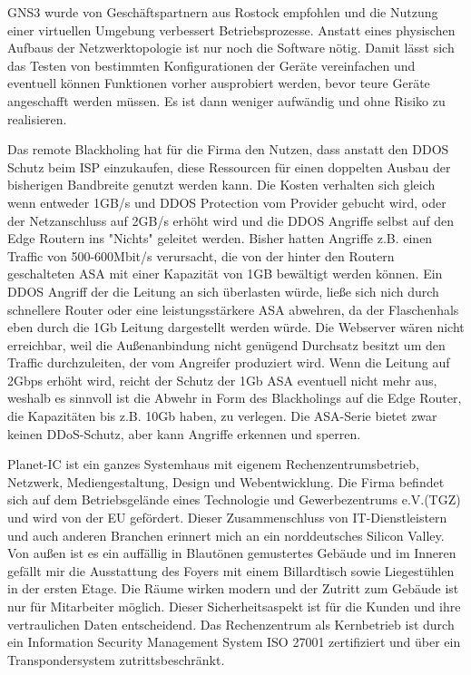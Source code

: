 \documentclass[english,runningheads,a4paper]{llncs}[2018/03/10]
\newcommand{\commentontext}[2]{\colorbox{yellow!60}{#1}\pdfcomment[color={0.234 0.867 0.211},hoffset=-6pt,voffset=10pt,opacity=0.5]{#2}}
\begin{document}
GNS3 wurde von Geschäftspartnern aus Rostock empfohlen und die Nutzung einer virtuellen Umgebung verbessert Betriebsprozesse. Anstatt eines physischen Aufbaus der Netzwerktopologie ist nur noch die Software nötig. Damit lässt sich das Testen von bestimmten Konfigurationen der Geräte vereinfachen und eventuell können Funktionen vorher ausprobiert werden, bevor teure Geräte angeschafft werden müssen. Es ist dann weniger aufwändig und ohne Risiko zu realisieren.

Das remote Blackholing hat für die Firma den Nutzen, dass anstatt den DDOS Schutz beim ISP einzukaufen, diese Ressourcen für einen doppelten Ausbau der bisherigen Bandbreite genutzt werden kann. Die Kosten verhalten sich gleich wenn entweder  1GB/s und DDOS Protection vom Provider gebucht wird, oder der Netzanschluss auf 2GB/s erhöht wird und die DDOS Angriffe selbst auf den Edge Routern ins "Nichts" geleitet werden. Bisher hatten Angriffe z.B. einen Traffic von 500-600Mbit/s verursacht, die von der hinter den Routern geschalteten ASA mit einer Kapazität von 1GB bewältigt werden können. Ein DDOS Angriff der die Leitung an sich überlasten würde, ließe sich nich durch schnellere Router oder eine leistungsstärkere ASA abwehren, da der Flaschenhals eben durch die 1Gb Leitung dargestellt werden würde. Die Webserver wären nicht erreichbar, weil die Außenanbindung  nicht genügend Durchsatz besitzt um den Traffic durchzuleiten, der vom Angreifer produziert wird. Wenn die Leitung auf 2Gbps erhöht wird, reicht der Schutz der 1Gb ASA eventuell nicht mehr aus, weshalb es sinnvoll ist die Abwehr in Form des Blackholings auf die Edge Router, die Kapazitäten bis z.B. 10Gb haben, zu verlegen. Die ASA-Serie bietet zwar keinen DDoS-Schutz, aber kann Angriffe erkennen und sperren.

Planet-IC ist ein ganzes Systemhaus mit eigenem Rechenzentrumsbetrieb, Netzwerk, Mediengestaltung, Design und Webentwicklung. Die Firma befindet sich auf dem Betriebsgelände eines Technologie und Gewerbezentrums e.V.(TGZ) und wird von der \commentontext{EU gefördert}{stimmt das?}. Dieser Zusammenschluss von IT-Dienstleistern und auch anderen Branchen erinnert mich an ein norddeutsches Silicon Valley.
Von außen ist es ein auffällig in Blautönen gemustertes Gebäude und im Inneren gefällt mir die Ausstattung des Foyers mit einem Billardtisch sowie Liegestühlen in der ersten Etage. Die Räume wirken modern und der Zutritt zum Gebäude ist nur für Mitarbeiter möglich. Dieser Sicherheitsaspekt ist für die Kunden und ihre vertraulichen Daten entscheidend.
Das Rechenzentrum als Kernbetrieb ist durch ein Information Security Management System ISO 27001 zertifiziert und über ein Transpondersystem zutrittsbeschränkt. 
\end{document}

